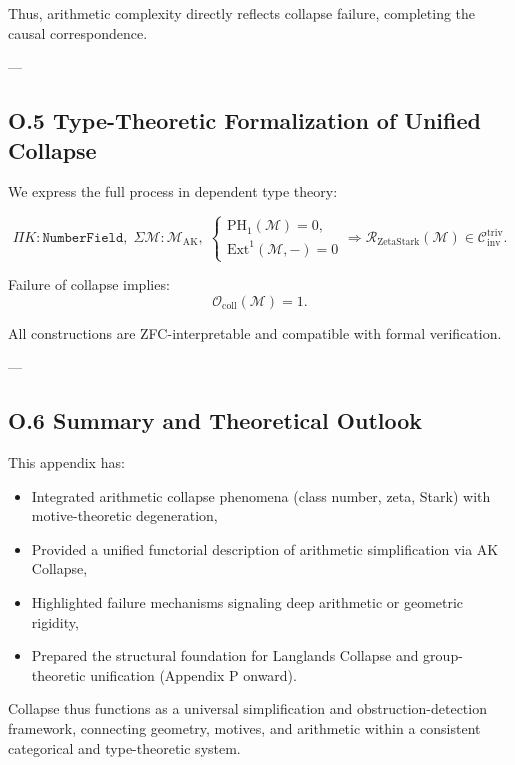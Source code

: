 \documentclass[11pt]{article}
\begin{document}
Thus, arithmetic complexity directly reflects collapse failure, completing the causal correspondence.

---

\subsection*{O.5 Type-Theoretic Formalization of Unified Collapse}

We express the full process in dependent type theory:

\[
\Pi K : \texttt{NumberField}, \;
\Sigma \mathcal{M} : \mathcal{M}_{\mathrm{AK}}, \;
\begin{cases}
\mathrm{PH}_1(\mathcal{M}) = 0, \\
\mathrm{Ext}^1(\mathcal{M}, -) = 0
\end{cases}
\Rightarrow
\mathcal{R}_{\mathrm{ZetaStark}}(\mathcal{M}) \in \mathcal{C}_{\mathrm{inv}}^{\mathrm{triv}}.
\]

Failure of collapse implies:
\[
\mathcal{O}_{\mathrm{coll}}(\mathcal{M}) = 1.
\]

All constructions are ZFC-interpretable and compatible with formal verification.

---

\subsection*{O.6 Summary and Theoretical Outlook}

This appendix has:
\begin{itemize}
  \item Integrated arithmetic collapse phenomena (class number, zeta, Stark) with motive-theoretic degeneration,
  \item Provided a unified functorial description of arithmetic simplification via AK Collapse,
  \item Highlighted failure mechanisms signaling deep arithmetic or geometric rigidity,
  \item Prepared the structural foundation for Langlands Collapse and group-theoretic unification (Appendix P onward).
\end{itemize}

Collapse thus functions as a universal simplification and obstruction-detection framework, connecting geometry, motives, and arithmetic within a consistent categorical and type-theoretic system.



\end{document}
